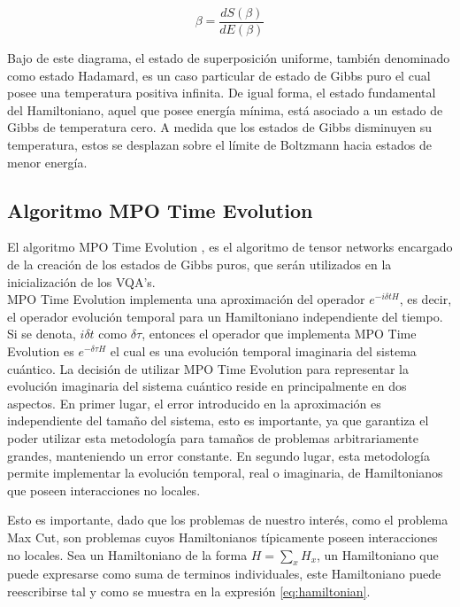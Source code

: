 \begin{equation}
  \beta = \frac{d S(\beta)}{d E(\beta)}
  \label{eq:temperature}
\end{equation}

Bajo de este diagrama, el estado de superposición uniforme, también denominado como estado Hadamard, es un caso particular de estado de Gibbs puro el cual posee una temperatura positiva infinita. De igual forma, el estado fundamental del Hamiltoniano, aquel que posee energía mínima, está asociado a un estado de Gibbs de temperatura cero. A medida que los estados de Gibbs disminuyen su temperatura, estos se desplazan sobre el límite de Boltzmann hacia estados de menor energía.

\subsection{Algoritmo MPO Time Evolution}

El algoritmo MPO Time Evolution \citep{zaletel}, es el algoritmo de tensor networks encargado de la creación de los estados de Gibbs puros, que serán utilizados en la inicialización de los VQA's.\\

MPO Time Evolution implementa una aproximación del operador $e^{- i \delta t H}$, es decir, el operador evolución temporal para un Hamiltoniano independiente del tiempo. Si se denota, $i \delta t$ como $\delta\tau$, entonces el operador que implementa MPO Time Evolution es $e^{- \delta \tau H}$ el cual es una evolución temporal imaginaria del sistema cuántico. La decisión de utilizar MPO Time Evolution para representar la evolución imaginaria del sistema cuántico reside en principalmente en dos aspectos. En primer lugar, el error introducido en la aproximación es independiente del tamaño del sistema, esto es importante, ya que garantiza el poder utilizar esta metodología para tamaños de problemas arbitrariamente grandes, manteniendo un error constante. En segundo lugar, esta metodología permite implementar la evolución temporal, real o imaginaria, de Hamiltonianos que poseen interacciones no locales. 

\newpage

Esto es importante, dado que los problemas de nuestro interés, como el problema Max Cut, son problemas cuyos Hamiltonianos típicamente poseen interacciones no locales. Sea un Hamiltoniano de la forma $H = \sum_{x} H_{x}$, un Hamiltoniano que puede expresarse como suma de terminos individuales, este Hamiltoniano puede reescribirse tal y como se muestra en la expresión \ref{eq:hamiltonian}.

